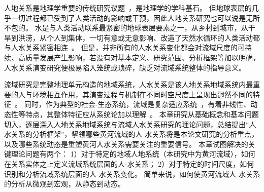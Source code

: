 
人地关系是地理学重要的传统研究议题~\cite{zhang2022c}，是地理学的学科基石。
但地球表层的几乎一切过程都已受到了人类活动的影响或干预，因此人地关系研究也可以说是无所不包的。
水是与人类活动联系最紧密的地球表层要素之一，从乡村到城市，从干旱到洪涝，从个人到集体，一切有意或无意影响、改造了天然水循环的人类活动都与人水关系紧密相连~\cite{falkenmark2021}。
但是，并非所有的人水关系变化都会对流域尺度的可持续、高质量发展产生影响，若没有对基本定义、研究范围、分析框架等加以明确，人水关系演变研究便极易陷入笼统或琐碎，缺乏对流域系统整体的指导意义。

流域研究是完整地理单元构造的地域系统，人水关系是该人地关系地域系统内最重要的人与环境相互作用，其演变过程与机制在不同时空尺度上呈现出迥然不同的特征~\cite{wang2019d}。
同时，作为典型的社会-生态系统，流域是复杂适应系统~\cite{huggins2022}，有着非线性、动态性等特点，其整体特征应从系统论加以理解~\cite{reyers2018}。
本章研究从基础概念和基本问题切入，逐层深入人地关系地域系统与流域人水关系研究的理论问题，总结提出“人水关系的分析框架”，挈领哪些黄河流域的人-水关系将是本论文研究的分析重点，以及哪些系统动态是重塑黄河人水关系需要关注的重要信号。
本章试图解决的关键理论问题有两个：
1）对于特定的地域人地系统（本研究中为黄河流域），如何在关系实体之上定义流域系统层面的人-水关系；
2）对于特定的时间尺度，如何识别和分析流域系统层面的人-水关系变化。
简单来说，如何使黄河流域人-水关系的分析从微观到宏观，从静态到动态。

